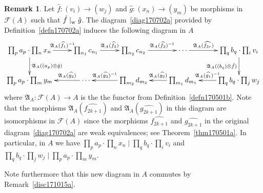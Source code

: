 \documentclass[reqno]{amsart}
\theoremstyle{plain}
\theoremstyle{definition}
\newtheorem{disc}[lem]{Remark}
\newcommand{\cat}[1]{\mathcal{#1}}
\newcommand{\catf}{\cat{F}}
\numberwithin{equation}{lem}
\newcommand{\divs}{\mid_{\text w}^{}}
\begin{document}
\begin{disc}\label{disc170702a}
Let $\hat f\colon (v_i)\to(w_j)$ and $\hat g\colon (x_n)\to(y_m)$ be morphisms in $\catf(A)$
such that $\hat f\divs\hat g$.
The diagram~\eqref{diag170702a} provided by
Definition~\ref{defn170702a}
induces the following diagram in $A$
$$\xymatrix{
\prod_pa_p\cdot\prod_nx_n\ar[d]^-{\mathfrak A_A((a_p)\otimes\hat g)}\ar[r]^-{\mathfrak A_A(\widehat{f_1})^{-1}}
&\prod_{n_1}c_{n_1}\ar[r]^-{\mathfrak A_A(\widehat{f_2})}
&\prod_{n_2}c_{n_2}\ar[r]^-{\mathfrak A_A(\widehat{f_3})^{-1}}
&\cdots\ar[r]^-{\mathfrak A_A(\widehat{f_{2r}})}
&\prod_qb_q\cdot\prod_iv_i\ar[d]_-{\mathfrak A_A((b_q)\otimes\hat f)}
\\
\prod_pa_p\cdot\prod_my_m
&\cdots\ar[l]_-{\mathfrak A_A(\widehat{g_2})}
&\prod_{m_2}d_{m_2}\ar[l]_-{\mathfrak A_A(\widehat{g_3})^{-1}}
&\prod_{m_1}d_{m_1}\ar[l]_-{\mathfrak A_A(\widehat{g_{2}})}
&\prod_qb_q\cdot\prod_jw_j\ar[l]_-{\mathfrak A_A(\widehat{g_1})^{-1}}
}$$
where $\mathfrak A_A\colon\catf(A)\to A$ is the the functor from Definition~\ref{defn170501b}.
Note that 
the morphisms $\mathfrak A_A(\widehat{f_{2k+1}})$ and $\mathfrak A_A(\widehat{g_{2k+1}})$ 
in this diagram are isomorphisms in $\catf(A)$ since  the morphisms $\widehat{f_{2k+1}}$ and $\widehat{g_{2k+1}}$ 
in the original diagram~\eqref{diag170702a}  are weak equivalences; see Theorem~\ref{thm170501a}.
In particular, in $A$ we have  $\prod_pa_p\cdot\prod_nx_n\mid\prod_qb_q\cdot\prod_iv_i$ and
$\prod_qb_q\cdot\prod_jw_j\mid\prod_pa_p\cdot\prod_my_m$.


Note furthermore that this new diagram in $A$ commutes by 
Remark~\ref{disc171015a}.


\end{disc}
\end{document}
